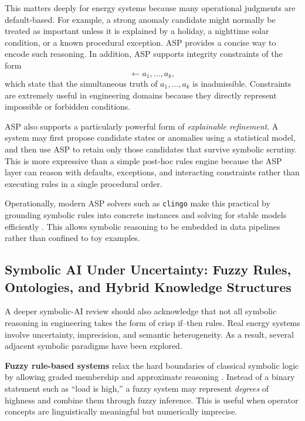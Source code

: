 This matters deeply for energy systems because many operational judgments are default-based. For example, a strong anomaly candidate might normally be treated as important unless it is explained by a holiday, a nighttime solar condition, or a known procedural exception. ASP provides a concise way to encode such reasoning. In addition, ASP supports integrity constraints of the form
\begin{equation}
	\leftarrow a_1,\dots,a_k,
	\label{eq:ch32_integrity_constraint}
\end{equation}
which state that the simultaneous truth of $a_1,\dots,a_k$ is inadmissible. Constraints are extremely useful in engineering domains because they directly represent impossible or forbidden conditions.

ASP also supports a particularly powerful form of \emph{explainable refinement}. A system may first propose candidate states or anomalies using a statistical model, and then use ASP to retain only those candidates that survive symbolic scrutiny. This is more expressive than a simple post-hoc rules engine because the ASP layer can reason with defaults, exceptions, and interacting constraints rather than executing rules in a single procedural order.

Operationally, modern ASP solvers such as \texttt{clingo} make this practical by grounding symbolic rules into concrete instances and solving for stable models efficiently \cite{gebser2019multi}. This allows symbolic reasoning to be embedded in data pipelines rather than confined to toy examples.

\subsection{Symbolic AI Under Uncertainty: Fuzzy Rules, Ontologies, and Hybrid Knowledge Structures}

A deeper symbolic-AI review should also acknowledge that not all symbolic reasoning in engineering takes the form of crisp if--then rules. Real energy systems involve uncertainty, imprecision, and semantic heterogeneity. As a result, several adjacent symbolic paradigms have been explored.

\textbf{Fuzzy rule-based systems} relax the hard boundaries of classical symbolic logic by allowing graded membership and approximate reasoning \cite{zadeh1965fuzzy,klir1995fuzzy}. Instead of a binary statement such as ``load is high,'' a fuzzy system may represent \emph{degrees} of highness and combine them through fuzzy inference. This is useful when operator concepts are linguistically meaningful but numerically imprecise.

